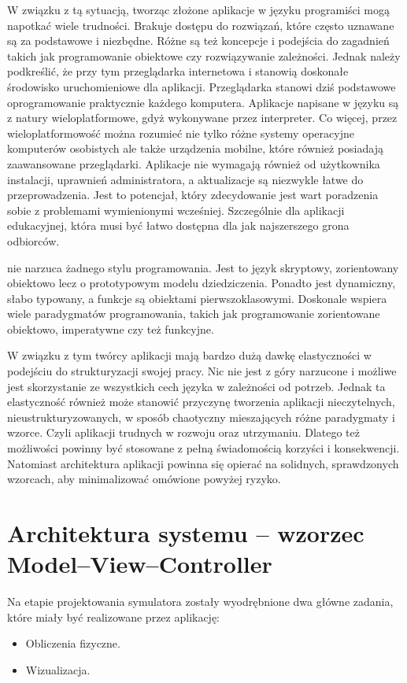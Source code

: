 W związku z tą sytuacją, tworząc złożone aplikacje w języku \js programiści
mogą napotkać wiele trudności. Brakuje dostępu do rozwiązań, które często
uznawane są za podstawowe i niezbędne. Różne są też koncepcje i podejścia do
zagadnień takich jak programowanie obiektowe czy rozwiązywanie zależności.
Jednak należy podkreślić, że przy tym przeglądarka internetowa i \js stanowią
doskonałe środowisko uruchomieniowe dla aplikacji. Przeglądarka stanowi dziś
podstawowe oprogramowanie praktycznie każdego komputera. Aplikacje napisane w
języku \js są z natury wieloplatformowe, gdyż wykonywane przez interpreter. Co
więcej, przez wieloplatformowość można rozumieć nie tylko różne systemy
operacyjne komputerów osobistych ale także urządzenia mobilne, które również
posiadają zaawansowane przeglądarki. Aplikacje \js nie wymagają również od
użytkownika instalacji, uprawnień administratora, a aktualizacje są niezwykle
łatwe do przeprowadzenia. Jest to potencjał, który zdecydowanie jest wart
poradzenia sobie z problemami wymienionymi wcześniej. Szczególnie dla aplikacji
edukacyjnej, która musi być łatwo dostępna dla jak najszerszego grona odbiorców.

\js nie narzuca żadnego stylu programowania. Jest to język skryptowy,
zorientowany obiektowo lecz o prototypowym modelu dziedziczenia. Ponadto jest
dynamiczny, słabo typowany, a funkcje są obiektami pierwszoklasowymi.
Doskonale wspiera wiele paradygmatów programowania, takich jak programowanie
zorientowane obiektowo, imperatywne czy też funkcyjne.

W związku z tym twórcy aplikacji mają bardzo dużą dawkę elastyczności w
podejściu do strukturyzacji swojej pracy. Nic nie jest z góry narzucone i
możliwe jest skorzystanie ze wszystkich cech języka w zależności od potrzeb.
Jednak ta elastyczność również może stanowić przyczynę tworzenia aplikacji
nieczytelnych, nieustrukturyzowanych, w sposób chaotyczny mieszających różne
paradygmaty i wzorce. Czyli aplikacji trudnych w rozwoju oraz utrzymaniu.
Dlatego też możliwości \js powinny być stosowane z pełną świadomością korzyści i
konsekwencji. Natomiast architektura aplikacji powinna się opierać na solidnych,
sprawdzonych wzorcach, aby minimalizować omówione powyżej ryzyko.

\section{Architektura systemu -- wzorzec Model--View--Controller}

Na etapie projektowania symulatora \en zostały wyodrębnione dwa główne zadania,
które miały być realizowane przez aplikację:
\begin{itemize}
\item Obliczenia fizyczne.
\item Wizualizacja.
\end{itemize}

